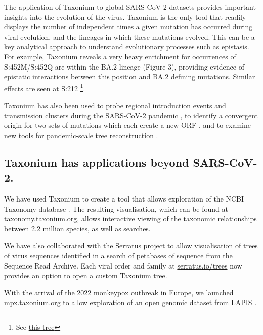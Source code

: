 The application of Taxonium to global SARS-CoV-2 datasets provides important insights into the evolution of the virus. Taxonium is the only tool that readily displays the number of independent times a given mutation has occurred during viral evolution, and the lineages in which these mutations evolved. This can be a key analytical approach to understand evolutionary processes such as epistasis. For example, Taxonium reveals a very heavy enrichment for occurrences of S:452M/S:452Q are within the BA.2 lineage (Figure 3), providing evidence of epistatic interactions between this position and BA.2 defining mutations. Similar effects are seen at S:212 \footnote{See \href{https://cov2tree.org/?srch=\%5B\%7B\%22key\%22\%3A\%22aa1\%22\%2C\%22type\%22\%3A\%22mutation\%22\%2C\%22method\%22\%3A\%22mutation\%22\%2C\%22text\%22\%3A\%22\%22\%2C\%22gene\%22\%3A\%22S\%22\%2C\%22position\%22\%3A\%22212\%22\%2C\%22new_residue\%22\%3A\%22any\%22\%2C\%22min_tips\%22\%3A\%2210\%22\%7D\%5D&color=\%7B\%22field\%22\%3A\%22None\%22\%7D}{this tree}}.

Taxonium has also been used  to probe  regional introduction events and transmission clusters during the SARS-CoV-2 pandemic \citep{mcbroome2022identifying}, to identify a convergent origin for two sets of mutations which each create a new ORF \citep{Mears2022}, and to examine new tools for pandemic-scale tree reconstruction \citep{DeMaio2022}.



\subsection*{Taxonium has applications beyond SARS-CoV-2.}

We have used Taxonium to create a tool that allows exploration of the NCBI Taxonomy database \citep{federhen2012ncbi}. The resulting visualisation, which can be found at \href{http://taxonomy.taxonium.org}{taxonomy.taxonium.org}, allows interactive viewing of the taxonomic relationships between 2.2 million species, as well as searches.


We have also collaborated with the Serratus project \citep{edgar2022petabase} to allow visualisation of trees of virus sequences identified in a search of petabases of sequence from the Sequence Read Archive. Each viral order and family at \href{http://serratus.io/trees}{serratus.io/trees} now provides an option to open a custom Taxonium tree.

With the arrival of the 2022 monkeypox outbreak in Europe, we launched \href{http://mpx.taxonium.org}{mpx.taxonium.org} to allow exploration of an open genomic dataset from LAPIS \citep{lapis}.



